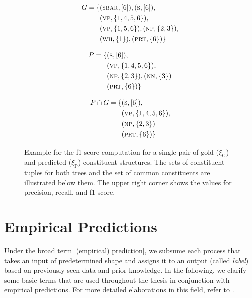 \documentclass[../document.tex]{subfiles}
\begin{document}
\begin{figure}
        \begin{minipage}{.35\linewidth}
            \small
            \begin{align*}
                G = \{
                &(\textsc{sbar}, [6]),
                (\textsc{s}, [6]), \\
                &(\textsc{vp}, \{1,4,5,6\}),\\
                &(\textsc{vp}, \{1,5,6\}),
                (\textsc{np}, \{2,3\}), \\
                &(\textsc{wh}, \{1\}),
                (\textsc{prt}, \{6\}) \}
            \end{align*}
        \end{minipage}
        \hfill
        \begin{minipage}{.3\linewidth}
            \small
            \begin{align*}
                P = \{
                &(\textsc{s}, [6]), \\
                &(\textsc{vp}, \{1,4,5,6\}),\\
                &(\textsc{np}, \{2,3\}),
                (\textsc{nn}, \{3\}) \\
                &(\textsc{prt}, \{6\}) \}
            \end{align*}
        \end{minipage}
        \hfill
        \begin{minipage}{.3\linewidth}
            \small
            \begin{align*}
                P \cap G = \{
                &(\textsc{s}, [6]), \\
                &(\textsc{vp}, \{1,4,5,6\}),\\
                &(\textsc{np}, \{2,3\}) \\
                &(\textsc{prt}, \{6\}) \}
            \end{align*}
        \end{minipage}

        \caption{
            Example for the f1-score computation for a single pair of gold (\(\xi_\text{G}\)) and predicted (\(\xi_\text{P}\)) constituent structures.
            The sets of constituent tuples for both trees and the set of common constituents are illustrated below them.
            The upper right corner shows the values for precision, recall, and f1-score.
        }
    \end{figure}

    \section{Empirical Predictions}
    Under the broad term [(empirical) prediction], we subsume each process that takes an input of predetermined shape and assigns it to an output (called \emph{label}) based on previously seen data and prior knowledge.
    In the following, we clarify some basic terms that are used throughout the thesis in conjunction with empirical predictions.
    For more detailed elaborations in this field, refer to .
\end{document}
